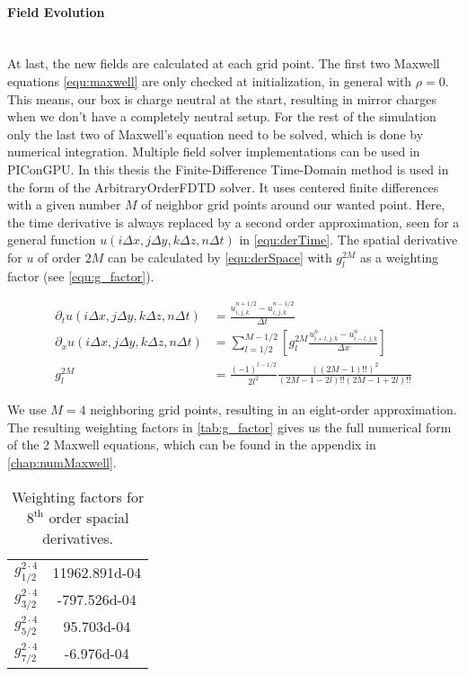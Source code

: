 \documentclass[bachelor_thesis]{subfiles}
\begin{document}
\paragraph*{Field Evolution}\hspace{0pt} \\
At last, the new fields are calculated at each grid point. The first two Maxwell equations \autoref{equ:maxwell} are only checked at initialization, in general with $\rho=0$. This means, our box is charge neutral at the start, resulting in mirror charges when we don't have a completely neutral setup.
For the rest of the simulation only the last two of Maxwell's equation need to be solved, which is done by numerical integration. 
Multiple field solver implementations can be used in PIConGPU. In this thesis the Finite-Difference Time-Domain method is used in the form of the ArbitraryOrderFDTD solver. It uses centered finite differences with a given number $M$ of neighbor grid points around our wanted point.
Here, the time derivative is always replaced by a second order approximation, seen for a general function $u(i\Delta x,j\Delta y,k\Delta z,n\Delta t)$ in \autoref{equ:derTime}. The spatial derivative for $u$ of order $2M$ can be calculated by \autoref{equ:derSpace} with $g_l^{2M}$ as a weighting factor (see \autoref{equ:g_factor}).

\begin{align}
\partial_t u(i\Delta x,j\Delta y,k\Delta z,n\Delta t) &= \frac{u_{i,j,k}^{n+1/2} - u_{i,j,k}^{n-1/2}}{\Delta t}								\label{equ:derTime}	\\
\partial_x u(i\Delta x,j\Delta y,k\Delta z,n\Delta t) &=  \sum\limits_{l=1/2}^{M-1/2} \left[ g^{2M}_l \frac{u_{i + l, j, k}^n - u_{i - l, j, k}^n}{\Delta x} \right] 	\label{equ:derSpace}	\\
g^{2M}_l &= \frac{(-1)^{l-1/2}}{2l^2} \frac{((2M-1)!!)^2}{(2M -1 - 2l)!! (2M -1 + 2l)!!}											\label{equ:g_factor}
\end{align}

We use $M=4$ neighboring grid points, resulting in an eight-order approximation. The resulting weighting factors in \autoref{tab:g_factor} gives us the full numerical form of the 2 Maxwell equations, which can be found in the appendix in \autoref{chap:numMaxwell}.
\begin{table}[h]
\begin{center}
\begin{tabular}{ |c|c| }
	\hline
	$g_{1/2}^{2\cdot 4}$ & \num{11962.891d-04} \\ 
	$g_{3/2}^{2\cdot 4}$ & \num{-797.526d-04} \\  
	$g_{5/2}^{2\cdot 4}$ & \num{95.703d-04} \\	
	$g_{7/2}^{2\cdot 4}$ & \num{-6.976d-04} \\
	 \hline
\end{tabular}
\caption{Weighting factors for $\mathrm{8^{th}}$ order spacial derivatives.}\label{tab:g_factor}
\end{center}
\end{table}
\end{document}
